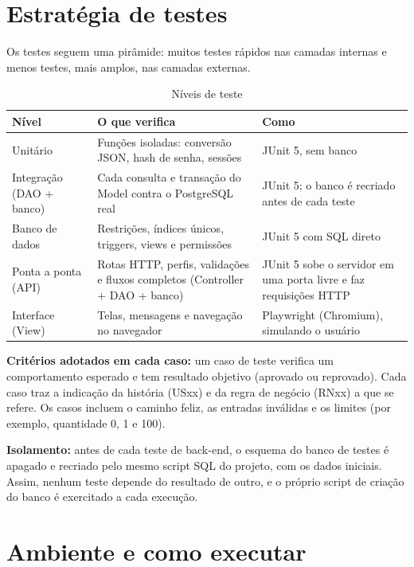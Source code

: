 \documentclass[12pt]{article}
\begin{document}
\section{Estratégia de testes}

Os testes seguem uma pirâmide: muitos testes rápidos nas camadas internas e menos testes, mais amplos, nas camadas externas.

\begin{table}[H]
\centering\small\renewcommand{\arraystretch}{1.3}
\begin{tabular}{|p{3.3cm}|p{5.3cm}|p{5.3cm}|}
\hline
\rowcolor{gray!30} \textbf{Nível} & \textbf{O que verifica} & \textbf{Como} \\ \hline
Unitário & Funções isoladas: conversão JSON, hash de senha, sessões & JUnit 5, sem banco \\ \hline
Integração (DAO + banco) & Cada consulta e transação do Model contra o PostgreSQL real & JUnit 5; o banco é recriado antes de cada teste \\ \hline
Banco de dados & Restrições, índices únicos, triggers, views e permissões & JUnit 5 com SQL direto \\ \hline
Ponta a ponta (API) & Rotas HTTP, perfis, validações e fluxos completos (Controller + DAO + banco) & JUnit 5 sobe o servidor em uma porta livre e faz requisições HTTP \\ \hline
Interface (View) & Telas, mensagens e navegação no navegador & Playwright (Chromium), simulando o usuário \\ \hline
\end{tabular}
\caption{Níveis de teste}
\end{table}

\textbf{Critérios adotados em cada caso:} um caso de teste verifica um comportamento esperado e tem resultado objetivo (aprovado ou reprovado). Cada caso traz a indicação da história (USxx) e da regra de negócio (RNxx) a que se refere. Os casos incluem o caminho feliz, as entradas inválidas e os limites (por exemplo, quantidade 0, 1 e 100).

\textbf{Isolamento:} antes de cada teste de back-end, o esquema do banco de testes é apagado e recriado pelo mesmo script SQL do projeto, com os dados iniciais. Assim, nenhum teste depende do resultado de outro, e o próprio script de criação do banco é exercitado a cada execução.

\section{Ambiente e como executar}
\end{document}
